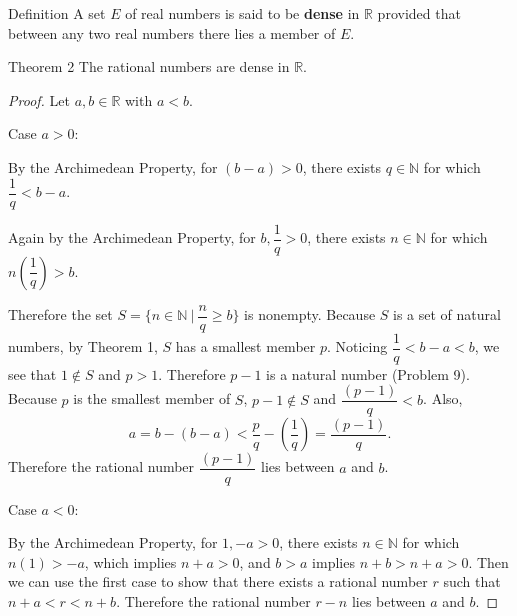 \begin{flushleft}
\begin{namedthm*}{Definition}
A set $E$ of real numbers is said to be \textbf{dense} in $\mathbb{R}$ provided that between any two real numbers there lies a member of $E$.	
\end{namedthm*}

\begin{namedthm*}{Theorem 2}
The rational numbers are dense in $\mathbb{R}$.	
\end{namedthm*}
\begin{proof}
Let $a,b \in \mathbb{R}$ with $a<b$.\par
Case $a>0$:\par
By the Archimedean Property, for $(b-a)>0$, there exists $q \in \mathbb{N}$ for which $\dfrac{1}{q} < b-a$. \par
Again by the Archimedean Property, for $b,\dfrac{1}{q}>0$, there exists $n \in \mathbb{N}$ for which $n(\dfrac{1}{q})>b$.\par
Therefore the set $S=\{n \in \mathbb{N} \ |\ \dfrac{n}{q} \ge b \}$ is nonempty. Because $S$ is a set of natural numbers, by Theorem 1, $S$ has a smallest member $p$.
Noticing $\dfrac{1}{q} < b-a < b$, we see that $1 \notin S$ and $p>1$. Therefore $p-1$ is a natural number (Problem 9).
Because $p$ is the smallest member of $S$, $p-1 \notin S$ and $\dfrac{(p-1)}{q} < b$.
Also, 
\[
a = b-(b-a) < \dfrac{p}{q} - (\dfrac{1}{q}) = \dfrac{(p-1)}{q}.
\]
Therefore the rational number $\dfrac{(p-1)}{q}$ lies between $a$ and $b$.\par
Case $a<0$:\par
By the Archimedean Property, for $1,-a>0$, there exists $n \in \mathbb{N}$ for which $n(1) > -a$, which implies $n+a>0$, and $b>a$ implies $n+b>n+a>0$.
Then we can use the first case to show that there exists a rational number $r$ such that $n+a<r<n+b$. Therefore the rational number $r-n$ lies between $a$ and $b$.
\end{proof}

\end{flushleft}

